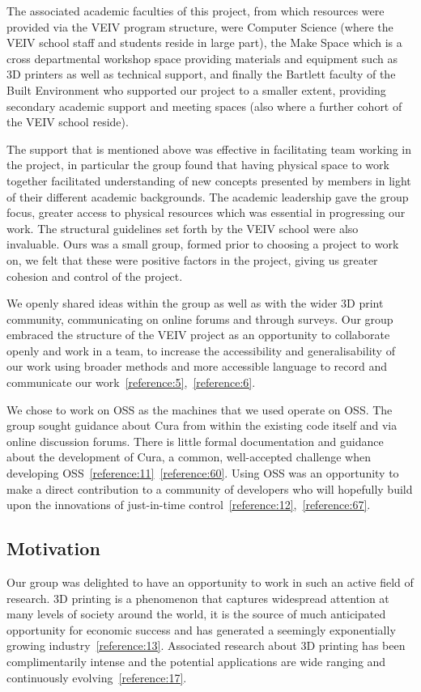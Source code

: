 \documentclass[11pt]{article} %
\begin{document}
The associated academic faculties of this project, from which resources were provided via the VEIV program structure, were Computer Science (where the VEIV school staff and students reside in large part), the Make Space which is a cross departmental workshop space providing materials and equipment such as 3D printers as well as technical support, and finally the Bartlett faculty of the Built Environment who supported our project to a smaller extent, providing secondary academic support and meeting spaces (also where a further cohort of the VEIV school reside).

The support that is mentioned above was effective in facilitating team working in the project, in particular the group found that having physical space to work together facilitated understanding of new concepts presented by members in light of their different academic backgrounds. The academic leadership gave the group focus, greater access to physical resources which was essential in progressing our work. The structural guidelines set forth by the VEIV school were also invaluable. Ours was a small group, formed prior to choosing a project to work on, we felt that these were positive factors in the project, giving us greater cohesion and control of the project. 

We openly shared ideas within the group as well as with the wider 3D print community, communicating on online forums and through surveys. Our group embraced the structure of the VEIV project as an opportunity to collaborate openly and work in a team, to increase the accessibility and generalisability of our work using broader methods and more accessible language to record and communicate our work~\ref{reference:5},~\ref{reference:6}. 

We chose to work on OSS as the machines that we used operate on OSS. The group sought guidance about Cura from within the existing code itself and via online discussion forums. There is little formal documentation and guidance about the development of Cura, a common, well-accepted challenge when developing OSS~\ref{reference:11}~\ref{reference:60}. Using OSS was an opportunity to make a direct contribution to a community of developers who will hopefully build upon the innovations of just-in-time control~\ref{reference:12},~\ref{reference:67}. 





\subsection{Motivation}
Our group was delighted to have an opportunity to work in such an active field of research. 3D printing is a phenomenon that captures widespread attention at many levels of society around the world, it is the source of much anticipated opportunity for economic success and has generated a seemingly exponentially growing industry~\ref{reference:13}. Associated research about 3D printing has been complimentarily intense and the potential applications are wide ranging and continuously evolving~\ref{reference:17}. 
\end{document}
